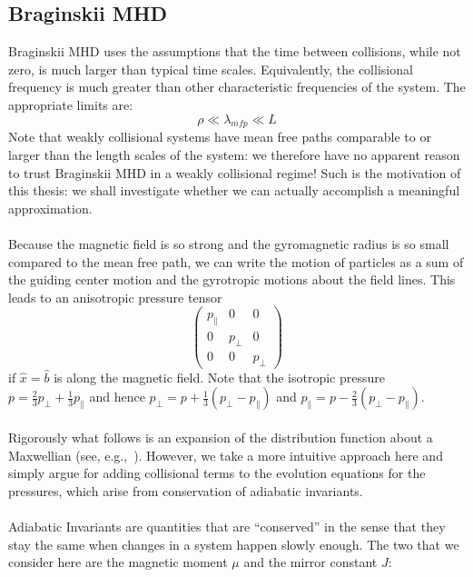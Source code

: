 
\subsection{Braginskii MHD} \label{ssec:bragMHD}
Braginskii MHD uses the assumptions that the time between collisions, while not zero, is much larger than typical time scales. Equivalently, the collisional frequency is much greater than other characteristic frequencies of the system. The appropriate limits are:
\begin{equation}
  \rho\ll\lambda_{mfp}\ll L \label{eq:bragord}
\end{equation}
Note that weakly collisional systems have mean free paths comparable to or larger than the length scales of the system: we therefore have no apparent reason to trust Braginskii MHD in a weakly collisional regime! Such is the motivation of this thesis: we shall investigate whether we can actually accomplish a meaningful approximation.\\
\\
Because the magnetic field is so strong and the gyromagnetic radius is so small compared to the mean free path, we can write the motion of particles as a sum of the guiding center motion and the gyrotropic motions about the field lines. This leads to an anisotropic pressure tensor
\begin{equation}
  \begin{pmatrix}
  p_\parallel & 0 & 0\\
  0 & p_\perp & 0\\
  0 & 0 & p_\perp
  \end{pmatrix}
\end{equation}
if $\hat x=\hat b$ is along the magnetic field. Note that the isotropic pressure $p=\frac23p_\perp+\frac13p_\parallel$ and hence $p_\perp=p+\frac13(p_\perp-p_\parallel)$ and $p_\parallel=p-\frac23(p_\perp-p_\parallel)$. \\
\\
Rigorously what follows is an expansion of the distribution function about a Maxwellian (see, e.g.,~\cite{Negulescu2016}). However, we take a more intuitive approach here and simply argue for adding collisional terms to the evolution equations for the pressures, which arise from conservation of adiabatic invariants.\\
\\
Adiabatic Invariants are quantities that are ``conserved'' in the sense that they stay the same when changes in a system happen slowly enough. The two that we consider here are the magnetic moment $\mu$ and the mirror constant $J$:
